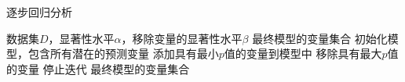 \documentclass{article}
\begin{document}
	
	\begin{algorithm}
		\caption{逐步回归分析}
		\begin{algorithmic}[1]
			\Require 数据集$D$，显著性水平$\alpha$，移除变量的显著性水平$\beta$
			\Ensure 最终模型的变量集合
			\State 初始化模型，包含所有潜在的预测变量
			\State 添加具有最小$p$值的变量到模型中
			\Else
			\State 移除具有最大$p$值的变量
			\Else
			\State 停止迭代
			\EndIf
			\EndIf
			\EndWhile
			\State \Return 最终模型的变量集合
		\end{algorithmic}
	\end{algorithm}
	
\end{document}
